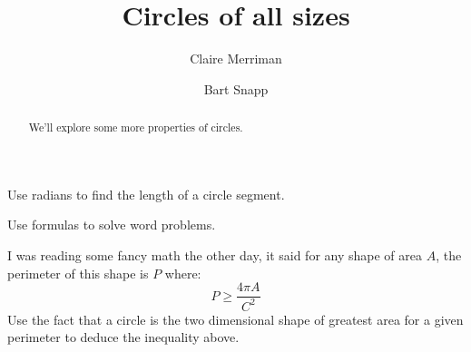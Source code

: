 \documentclass[noauthor,nooutcomes,handout]{ximera}
\title{Circles of all sizes}
\author{Claire Merriman \and Bart Snapp}
\begin{document}
\begin{abstract}
  We'll explore some more properties of circles.
\end{abstract}
\maketitle

\begin{listOutcomes}
\item Use radians to find the length of a circle segment.
\item Use formulas to solve word problems.
\end{listOutcomes}



\mynewpage

\begin{question}
  I was reading some fancy math the other day, it said for any shape
  of area $A$, the perimeter of this shape is $P$ where:
  \[
  P \ge \frac{4\pi A}{C^2}
  \]
  Use the fact that a circle is the two dimensional shape of greatest
  area for a given perimeter to deduce the inequality above.
\end{question}
\mynewpage
\end{document}
